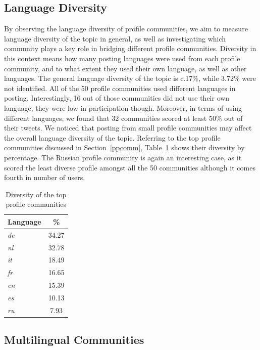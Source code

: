 \subsection{Language Diversity}

By observing the language diversity of profile communities, we aim to
measure language diversity of the topic in general, as well as
investigating which community plays a key role in bridging different
profile communities. Diversity in this context means how many posting
languages were used from each profile community, and to what extent
they used their own language, as well as other languages.  The general
language diversity of the topic is c.17\%, while 3.72\% were not
identified. All of the 50 profile communities used different languages
in posting. Interestingly, 16 out of those communities did not use
their own language, they were low in participation though. Moreover,
in terms of using different languages, we found that 32 communities
scored at least 50\% out of their tweets. We noticed that posting from
small profile communities may affect the overall language diversity of
the topic. Referring to the top profile communities discussed in
Section~\ref{ppcomm}, Table~\ref{tbl:diversity} shows their
diversity by percentage. The Russian profile community is again an
interesting case, as it scored the least diverse profile amongst all
the 50 communities although it comes fourth in number of users.


\begin{table}[!htb]
\centering
\begin{tabular}{@{}lc}
\toprule
\textbf{Language} & \textbf{\%} \\ 
\midrule
{\emph{de}} & 34.27 \\
{\emph{nl}} & 32.78 \\
{\emph{it}} & 18.49 \\ 
{\emph{fr}} & 16.65 \\
{\emph{en}} & 15.39 \\
{\emph{es}} & 10.13 \\
{\emph{ru}} & 7.93 \\
\bottomrule
\end{tabular}
\caption{Diversity of the top profile communities}
\label{tbl:diversity}
\end{table}


\subsection{Multilingual Communities}

